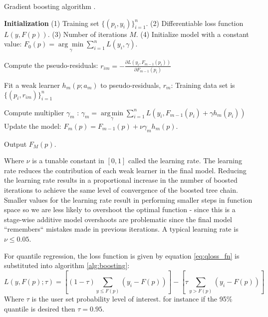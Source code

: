 \begin{algorithm}[H]
    \caption{Gradient boosting algorithm \cite{friedman2002}.}
    \begin{algorithmic}
    \STATE \textbf{Initialization} 
    \STATE (1) Training set $\{(p_i, y_i)\}_{i=1}^n$. 
    \STATE (2) Differentiable loss function $L(y, F(p))$. 
    \STATE (3) Number of iterations ${{M}}$.
    \STATE (4)   Initialize model with a constant value:
        $F_0(p) = \underset{\gamma}{\arg\min} \sum_{i=1}^n L(y_i, \gamma).$
    
        \STATE Compute the pseudo-residuals:  
            \STATE $r_{im} = -\frac{\partial L(y_i, F_{m-1}(p_i))}{\partial F_{m-1}(p_i)}$
        \ENDFOR
        
        \STATE Fit a weak learner $h_m(p; a_m)$ to pseudo-residuals, $r_{m}$: Training data set is $\{(p_i, r_{im})\}_{i=1}^n$ \;
        
        \STATE Compute multiplier $\gamma_m$ :
        $\gamma_m = \underset{\gamma}{\operatorname{arg\,min}} \sum_{i=1}^n L\left(y_i, F_{m-1}(p_i) + \gamma h_m(p_i)\right)$\;
        \STATE Update the model:
        $F_m(p) = F_{m-1}(p) + \nu \gamma_m h_m(p).$
    
    \ENDFOR
    \STATE Output $F_M(p).$
    \end{algorithmic}
\label{alg:boosting}
\end{algorithm}
Where $\nu$ is a tunable constant in $[0, 1]$ called the learning rate.  The learning rate reduces the contribution of each weak learner in the final model.  Reducing the learning rate results in a proportional increase in the number of boosted iterations to achieve the same level of convergence of the boosted tree chain.  Smaller values for the learning rate result in performing smaller steps in function space so we are less likely to overshoot the optimal function - since this is a stage-wise additive model overshoots are problematic since the final model ``remembers`` mistakes made in previous iterations.  A typical learning rate is $\nu\leq 0.05$.

For quantile regression, the loss function is given by equation \ref{eq:qloss_fn} is substituted into algorithm \ref{alg:boosting}:
\begin{equation}
L(y, F(p);\tau) = \left[ (1-\tau) \sum_{y \leq F(p)}( y_i - F(p) ) \right] - \left[ \tau \sum_{y > F(p)} (y_i - F(p)) \right]
\end{equation}
Where $\tau$ is the user set probability level of interest. for instance if the 95\% quantile is desired then $\tau=0.95$.


